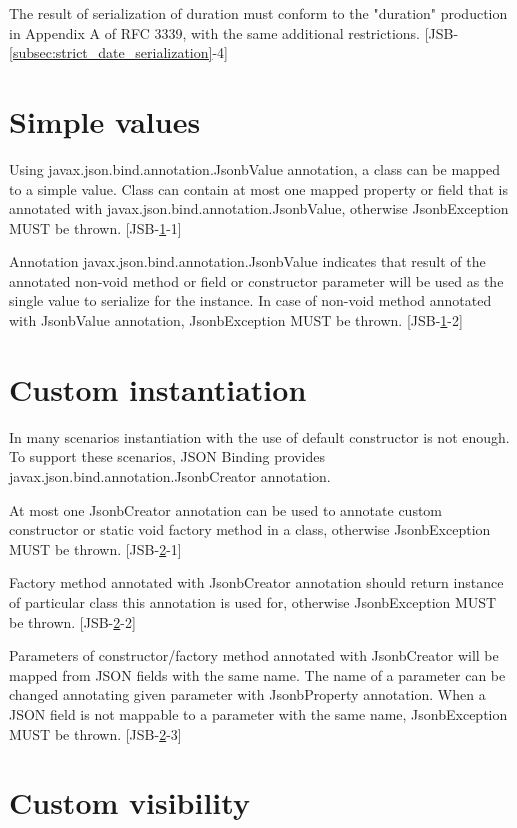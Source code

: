 The result of serialization of duration must conform to the "duration" production in Appendix A of RFC 3339, with the same additional restrictions. [JSB-\ref{subsec:strict_date_serialization}-4]

\section{Simple values}
\label{sec:simple_values}

Using javax.json.bind.annotation.JsonbValue annotation, a class can be mapped to a simple value. Class can contain at most one mapped property or field that is annotated with javax.json.bind.annotation.JsonbValue, otherwise JsonbException MUST be thrown.
[JSB-\ref{sec:simple_values}-1]

Annotation javax.json.bind.annotation.JsonbValue indicates that result of the annotated non-void method or field or constructor parameter will be used as the single value to serialize for the instance. In case of non-void method annotated with JsonbValue annotation, JsonbException MUST be thrown.
[JSB-\ref{sec:simple_values}-2]

\section{Custom instantiation}
\label{sec:custom_instantiation}

In many scenarios instantiation with the use of default constructor is not enough. To support these scenarios, JSON Binding provides javax.json.bind.annotation.JsonbCreator annotation.

At most one JsonbCreator annotation can be used to annotate custom constructor or static void factory method in a class, otherwise JsonbException MUST be thrown. [JSB-\ref{sec:custom_instantiation}-1]

Factory method annotated with JsonbCreator annotation should return instance of particular class this annotation is used for, otherwise JsonbException MUST be thrown. [JSB-\ref{sec:custom_instantiation}-2]

Parameters of constructor/factory method annotated with JsonbCreator will be mapped from JSON fields with the same name. The name of a parameter can be changed annotating given parameter with JsonbProperty annotation. When a JSON field is not mappable to a parameter with the same name, JsonbException MUST be thrown. [JSB-\ref{sec:custom_instantiation}-3]

\section{Custom visibility}
\label{sec:custom_visibility}

